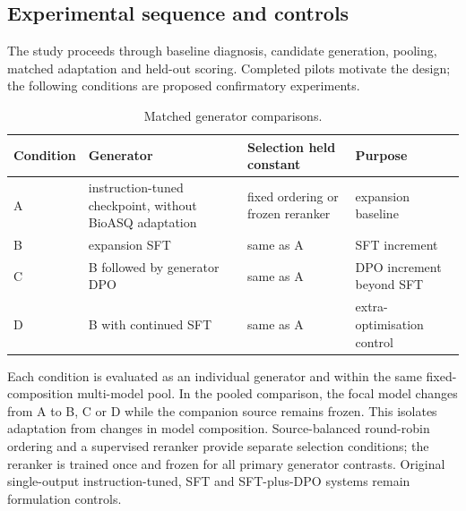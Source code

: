 \documentclass[12pt,a4paper]{article}
\begin{document}
\subsection{Experimental sequence and controls}

The study proceeds through baseline diagnosis, candidate generation, pooling, matched adaptation and held-out scoring. Completed pilots motivate the design; the following conditions are proposed confirmatory experiments.

\begin{table}[htbp]
\centering
\caption{Matched generator comparisons.}
\label{tab:training}
\small
{}
\begin{tabularx}{\textwidth}{>{\raggedright\arraybackslash}p{}>{\raggedright\arraybackslash}X>{\raggedright\arraybackslash}X>{\raggedright\arraybackslash}X}
\toprule
\textbf{Condition} & \textbf{Generator} & \textbf{Selection held constant} & \textbf{Purpose} \\
\midrule
A & instruction-tuned checkpoint, without BioASQ adaptation & fixed ordering or frozen reranker & expansion baseline \\
B & expansion SFT & same as A & SFT increment \\
C & B followed by generator DPO & same as A & DPO increment beyond SFT \\
D & B with continued SFT & same as A & extra-optimisation control \\
\bottomrule
\end{tabularx}
\end{table}

Each condition is evaluated as an individual generator and within the same fixed-composition multi-model pool. In the pooled comparison, the focal model changes from A to B, C or D while the companion source remains frozen. This isolates adaptation from changes in model composition. Source-balanced round-robin ordering and a supervised reranker provide separate selection conditions; the reranker is trained once and frozen for all primary generator contrasts. Original single-output instruction-tuned, SFT and SFT-plus-DPO systems remain formulation controls.
\end{document}

